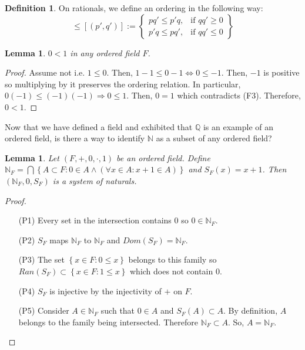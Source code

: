 \documentclass{article}
\newcommand\N{\ensuremath{\mathbb{N}}}
\newcommand\Q{\ensuremath{\mathbb{Q}}}
\newtheorem{lemma}[theorem]{Lemma}
\theoremstyle{definition}
\newtheorem{definition}{Definition}[subsection]
\theoremstyle{remark}
\theoremstyle{plain}
\begin{document}
\begin{definition}
    On rationals, we define an ordering in the following way:
    \begin{equation}
        [(p,q)] \leq [(p',q')]:=
        \left\{
            \begin{array}{lr}
                pq' \leq p'q, & \text{if } qq' \geq 0\\
                p'q \leq pq', & \text{if } qq' \leq 0
            \end{array}
        \right\}
        \end{equation}
\end{definition}

\begin{lemma}
    \(0<1\) in any ordered field \(F\).
\end{lemma}
\begin{proof}
    Assume not i.e. \(1 \leq 0\). Then, \(1-1 \leq 0-1 \iff 0 \leq -1\). Then, \(-1\) is positive so multiplying by it
    preserves the ordering relation. In particular, \(0(-1) \leq (-1)(-1) \Rightarrow 0 \leq 1\). Then, \( 0 = 1\) which
    contradicts (F3). Therefore, \(0 < 1\).
\end{proof}

Now that we have defined a field and exhibited that \(\Q\) is an example of an ordered field, 
is there a way to identify \(\N\) as a subset of any ordered field?

\begin{lemma}
    Let \((F, +, 0, \cdot, 1)\) be an ordered field. Define \(\N_F = \bigcap \left\{ A\subset F: 0 \in A \land (\forall x \in A: x+1\in A) \right\}\)
    and \(S_F(x) = x+1\). Then \((\N_F, 0, S_F)\) is a system of naturals.
\end{lemma}
\begin{proof}
    \begin{enumerate}
        \item[(P1)] Every set in the intersection contains \(0\) so \(0 \in \N_F\).
        \item[(P2)] \(S_F\) maps \(\N_F\) to \(\N_F\) and \(Dom(S_F) = \N_F\).
        \item[(P3)] The set \(\left\{ x \in F: 0 \leq x \right\}\) belongs to this family
        so \(Ran(S_F)\subset \left\{ x \in F: 1 \leq x \right\}\) which does not contain \(0\).
        \item[(P4)] \(S_F\) is injective by the injectivity of \(+\) on \(F\).
        \item[(P5)] Consider \(A \in \N_F\) such that \(0 \in A\) and \(S_F(A) \subset A\).
        By definition, \(A\) belongs to the family being intersected. Therefore \(\N_F \subset A\). 
        So, \(A = \N_F\).
    \end{enumerate}
\end{proof}
\end{document}
